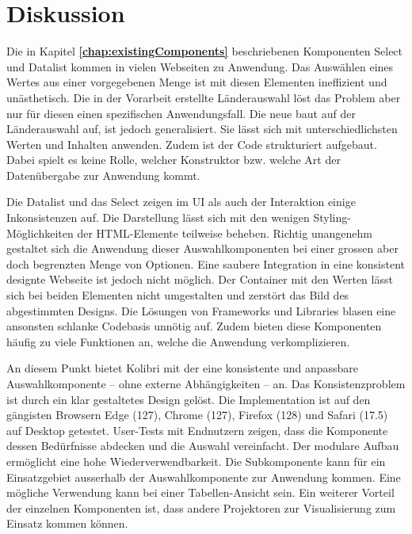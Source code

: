 \chapter{Diskussion}
\label{chap:discussion}

Die in Kapitel \textbf{\ref{chap:existingComponents}} beschriebenen Komponenten Select und Datalist kommen in vielen Webseiten zu Anwendung. 
Das Auswählen eines Wertes aus einer vorgegebenen Menge ist mit diesen Elementen ineffizient und unästhetisch.
Die in der Vorarbeit erstellte Länderauswahl löst das Problem aber nur für diesen einen spezifischen Anwendungsfall. 
Die neue  baut auf der Länderauswahl auf, ist jedoch generalisiert. 
Sie lässt sich mit unterschiedlichsten Werten und Inhalten anwenden. 
Zudem ist der Code strukturiert aufgebaut. 
Dabei spielt es keine Rolle, welcher Konstruktor bzw. welche Art der Datenübergabe zur Anwendung kommt. 

Die Datalist und das Select zeigen im UI als auch der Interaktion einige Inkonsistenzen auf. 
Die Darstellung lässt sich mit den wenigen Styling-Möglichkeiten der HTML-Elemente teilweise beheben. 
Richtig unangenehm gestaltet sich die Anwendung dieser Auswahlkomponenten bei einer grossen aber doch begrenzten Menge von Optionen. 
Eine saubere Integration in eine konsistent designte Webseite ist jedoch nicht möglich.
Der Container mit den Werten lässt sich bei beiden Elementen nicht umgestalten und zerstört das Bild des abgestimmten Designs. 
Die Lösungen von Frameworks und Libraries blasen eine ansonsten schlanke Codebasis unnötig auf. 
Zudem bieten diese Komponenten häufig zu viele Funktionen an, welche die Anwendung verkomplizieren. 

An diesem Punkt bietet Kolibri mit der  eine konsistente und anpassbare Auswahlkomponente – ohne externe Abhängigkeiten – an. 
Das Konsistenzproblem ist durch ein klar gestaltetes Design gelöst. 
Die Implementation ist auf den gängisten Browsern Edge (127), Chrome (127), Firefox (128) und Safari (17.5) auf Desktop getestet. 
User-Tests mit Endnutzern zeigen, dass die Komponente dessen Bedürfnisse abdecken und die Auswahl vereinfacht. 
Der modulare Aufbau ermöglicht eine hohe Wiederverwendbarkeit. 
Die Subkomponente  kann für ein Einsatzgebiet ausserhalb der Auswahlkomponente zur Anwendung kommen. 
Eine mögliche Verwendung kann bei einer Tabellen-Ansicht sein. 
Ein weiterer Vorteil der einzelnen Komponenten ist, dass andere Projektoren zur Visualisierung zum Einsatz kommen können. 

